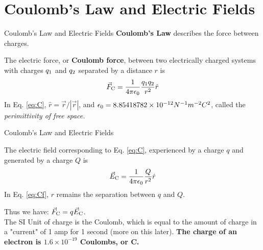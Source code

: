 \documentclass{beamer}
\begin{document}
\section{Coulomb’s Law and Electric Fields}

\begin{frame}{Coulomb’s Law and Electric Fields}
\textbf{Coulomb's Law} describes the force between charges. \\ \vspace{0.5cm}
\begin{tcolorbox}[colback=white,colframe=red!40!blue,title=Coulomb's Law]
\alert{The electric force, or \textbf{Coulomb force}, between two electrically charged systems with charges $q_{\rm 1}$ and $q_{\rm 2}$ separated by a distance $r$ is
\begin{equation}
\vec{F}_{\rm C} = \frac{1}{4\pi\epsilon_{\rm 0}} \frac{q_{\rm 1} q_{\rm 2}}{r^2} \hat{r} \label{eq:C}
\end{equation}
In Eq. \ref{eq:C}, $\hat{r} = \vec{r}/|\vec{r}|$, and $\epsilon_{\rm 0} = 8.85418782\times 10^{-12} N^{-1} m^{-2} C^2$, called the \textit{perimittivity of free space.}}
\end{tcolorbox}
\end{frame}

\begin{frame}{Coulomb’s Law and Electric Fields}
\begin{tcolorbox}[colback=white,colframe=red!40!blue,title=Coulomb Field]
\alert{The electric field corresponding to Eq. \ref{eq:C}, experienced by a charge $q$ and generated by a charge $Q$ is 
\begin{equation}
\vec{E}_{\rm C} = \frac{1}{4\pi\epsilon_{\rm 0}} \frac{Q}{r^2} \hat{r} \label{eq:Cf}
\end{equation}
In Eq. \ref{eq:Cf}, $r$ remains the separation between $q$ and $Q$.}
\end{tcolorbox}
Thus we have: $\vec{F}_{\rm C} = q \vec{E}_{\rm C}$. \\ \vspace{0.5cm}
The SI Unit of charge is the Coulomb, which is equal to the amount of charge in a "current" of 1 amp for 1 second (more on this later).  \textbf{The charge of an electron is $1.6\times 10^{-19}$ Coulombs, or C.}
\end{frame}
\end{document}
